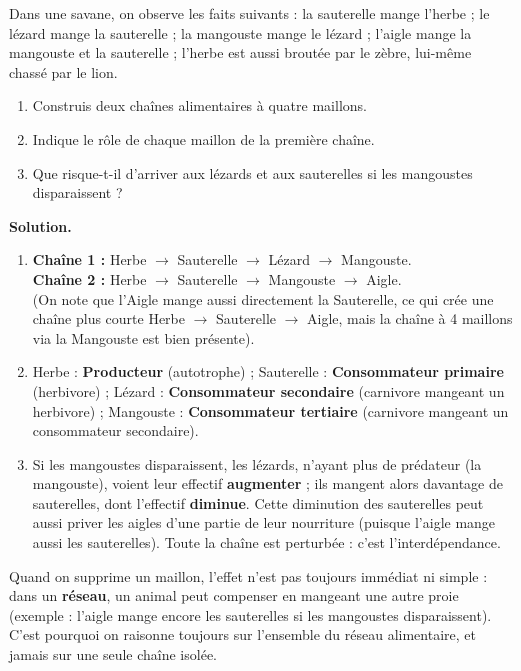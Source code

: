 \documentclass[11pt]{article}
\begin{document}
\begin{exoresolu}
Dans une savane, on observe les faits suivants : la sauterelle mange l'herbe ; le lézard mange la sauterelle ; la mangouste mange le lézard ; l'aigle mange la mangouste et la sauterelle ; l'herbe est aussi broutée par le zèbre, lui-même chassé par le lion.
\begin{enumerate}
\item Construis deux chaînes alimentaires à quatre maillons.
\item Indique le rôle de chaque maillon de la première chaîne.
\item Que risque-t-il d'arriver aux lézards et aux sauterelles si les mangoustes disparaissent ?
\end{enumerate}
\tcblower
\textbf{Solution.}
\begin{enumerate}
\item \textbf{Chaîne 1 :} Herbe $\rightarrow$ Sauterelle $\rightarrow$ Lézard $\rightarrow$ Mangouste. \\
      \textbf{Chaîne 2 :} Herbe $\rightarrow$ Sauterelle $\rightarrow$ Mangouste $\rightarrow$ Aigle. \\
      (On note que l'Aigle mange aussi directement la Sauterelle, ce qui crée une chaîne plus courte Herbe $\rightarrow$ Sauterelle $\rightarrow$ Aigle, mais la chaîne à 4 maillons via la Mangouste est bien présente).
\item Herbe : \textbf{Producteur} (autotrophe) ; Sauterelle : \textbf{Consommateur primaire} (herbivore) ; Lézard : \textbf{Consommateur secondaire} (carnivore mangeant un herbivore) ; Mangouste : \textbf{Consommateur tertiaire} (carnivore mangeant un consommateur secondaire).
\item Si les mangoustes disparaissent, les lézards, n'ayant plus de prédateur (la mangouste), voient leur effectif \textbf{augmenter} ; ils mangent alors davantage de sauterelles, dont l'effectif \textbf{diminue}. Cette diminution des sauterelles peut aussi priver les aigles d'une partie de leur nourriture (puisque l'aigle mange aussi les sauterelles). Toute la chaîne est perturbée : c'est l'interdépendance.
\end{enumerate}
\end{exoresolu}

\begin{attention}
Quand on supprime un maillon, l'effet n'est pas toujours immédiat ni simple : dans un \textbf{réseau}, un animal peut compenser en mangeant une autre proie (exemple : l'aigle mange encore les sauterelles si les mangoustes disparaissent). C'est pourquoi on raisonne toujours sur l'ensemble du réseau alimentaire, et jamais sur une seule chaîne isolée.
\end{attention}
\end{document}
